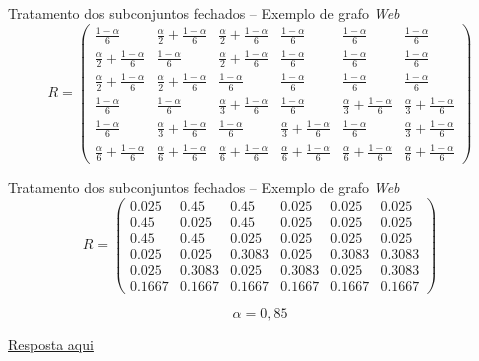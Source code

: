 \documentclass[aspectratio=169]{beamer}
\begin{document}
\begin{frame}{Tratamento dos subconjuntos fechados -- Exemplo de grafo \emph{Web}}
$$R=\begin{pmatrix}
  \frac{1-\alpha}{6} & \frac{\alpha}{2}+\frac{1-\alpha}{6} &
  \frac{\alpha}{2}+\frac{1-\alpha}{6} & \frac{1-\alpha}{6} &
  \frac{1-\alpha}{6} &
  \frac{1-\alpha}{6}\\[0.5em]
  \frac{\alpha}{2}+\frac{1-\alpha}{6} & \frac{1-\alpha}{6} &
  \frac{\alpha}{2}+\frac{1-\alpha}{6}
  & \frac{1-\alpha}{6} & \frac{1-\alpha}{6} & \frac{1-\alpha}{6}\\[0.5em]
  \frac{\alpha}{2}+\frac{1-\alpha}{6} &
  \frac{\alpha}{2}+\frac{1-\alpha}{6} & \frac{1-\alpha}{6}
  & \frac{1-\alpha}{6} & \frac{1-\alpha}{6} & \frac{1-\alpha}{6}\\[0.5em]
  \frac{1-\alpha}{6} & \frac{1-\alpha}{6} &
  \frac{\alpha}{3}+\frac{1-\alpha}{6} & \frac{1-\alpha}{6} &
  \frac{\alpha}{3}+\frac{1-\alpha}{6} & \frac{\alpha}{3}+\frac{1-\alpha}{6}\\[0.5em]
  \frac{1-\alpha}{6} & \frac{\alpha}{3}+\frac{1-\alpha}{6} &
  \frac{1-\alpha}{6} & \frac{\alpha}{3}+\frac{1-\alpha}{6} &
  \frac{1-\alpha}{6} & \frac{\alpha}{3}+\frac{1-\alpha}{6}\\[0.5em]
  \frac{\alpha}{6}+\frac{1-\alpha}{6} &
  \frac{\alpha}{6}+\frac{1-\alpha}{6} &
  \frac{\alpha}{6}+\frac{1-\alpha}{6} &
  \frac{\alpha}{6}+\frac{1-\alpha}{6} &
  \frac{\alpha}{6}+\frac{1-\alpha}{6} &
  \frac{\alpha}{6}+\frac{1-\alpha}{6}
\end{pmatrix}
$$

\end{frame}%
\begin{frame}{Tratamento dos subconjuntos fechados -- Exemplo de grafo \emph{Web}}
$$R=\begin{pmatrix}
0.025  & 0.45   & 0.45   & 0.025  & 0.025  & 0.025 \\[0.3em]
0.45   & 0.025  & 0.45   & 0.025  & 0.025  & 0.025 \\[0.3em]
0.45   & 0.45   & 0.025  & 0.025  & 0.025  & 0.025 \\[0.3em]
0.025  & 0.025  & 0.3083 & 0.025  & 0.3083 & 0.3083 \\[0.3em]
0.025  & 0.3083 & 0.025  & 0.3083 & 0.025  & 0.3083 \\[0.3em]
0.1667 & 0.1667 & 0.1667 & 0.1667 & 0.1667 & 0.1667
\end{pmatrix}
$$

\begin{center}
  $$\alpha = 0{,}85$$
\end{center}

\href{https://pagerank-ipe.streamlit.app/}{Resposta aqui}

\end{frame}
\end{document}
